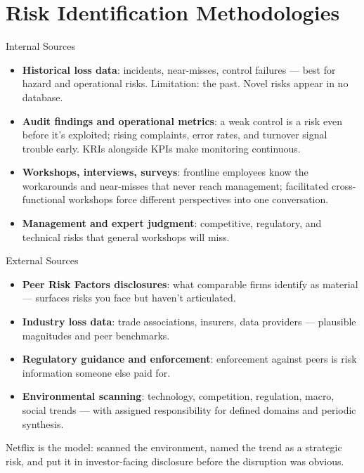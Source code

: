 \documentclass[11pt, aspectratio=169]{beamer}
\begin{document}
\section{Risk Identification Methodologies}

\begin{frame}{Internal Sources}
\begin{itemize}
  \item \textbf{Historical loss data}: incidents, near-misses, control failures --- best for hazard and operational risks. Limitation: the past. Novel risks appear in no database.
  \item \textbf{Audit findings and operational metrics}: a weak control is a risk even before it's exploited; rising complaints, error rates, and turnover signal trouble early. \alert{KRIs} alongside KPIs make monitoring continuous.
  \item \textbf{Workshops, interviews, surveys}: frontline employees know the workarounds and near-misses that never reach management; facilitated cross-functional workshops force different perspectives into one conversation.
  \item \textbf{Management and expert judgment}: competitive, regulatory, and technical risks that general workshops will miss.
\end{itemize}
\end{frame}

\begin{frame}{External Sources}
\begin{itemize}
  \item \textbf{Peer Risk Factors disclosures}: what comparable firms identify as material --- surfaces risks you face but haven't articulated.
  \item \textbf{Industry loss data}: trade associations, insurers, data providers --- plausible magnitudes and peer benchmarks.
  \item \textbf{Regulatory guidance and enforcement}: enforcement against peers is risk information someone else paid for.
  \item \textbf{Environmental scanning}: technology, competition, regulation, macro, social trends --- with assigned responsibility for defined domains and periodic synthesis.
\end{itemize}
\medskip
Netflix is the model: scanned the environment, named the trend as a strategic risk, and put it in investor-facing disclosure before the disruption was obvious.
\end{frame}
\end{document}
